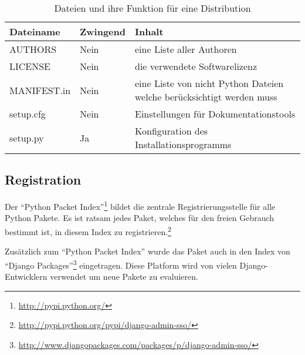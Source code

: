 \begin{table}[ht]
  \centering
  \begin{tabular}{|l|l|p{7cm}|}
  \hline
  Dateiname & Zwingend & Inhalt\\
  \hline
  AUTHORS & Nein & eine Liste aller Authoren\\
  \hline
  LICENSE & Nein & die verwendete Softwarelizenz\\
  \hline
  MANIFEST.in & Nein & eine Liste von nicht Python Dateien welche berücksichtigt werden muss\\
  \hline
  setup.cfg & Nein & Einstellungen für Dokumentationstools\\
  \hline
  setup.py & Ja & Konfiguration des Installationsprogramms\\
  \hline
  \end{tabular}
  \caption{Dateien und ihre Funktion für eine Distribution}
  \label{tab:paket_inhalt}
\end{table}

\subsection{Registration}
\label{sub:registration}
Der ``Python Packet Index''\footnote{\url{http://pypi.python.org/}} bildet die zentrale Registrierungsstelle für alle Python Pakete. Es ist ratsam jedes Paket, welches für den freien Gebrauch bestimmt ist, in diesem Index zu registrieren.\footnote{\url{http://pypi.python.org/pypi/django-admin-sso/}}

Zusätzlich zum ``Python Packet Index'' wurde das Paket auch in den Index von ``Django Packages''\footnote{\url{http://www.djangopackages.com/packages/p/django-admin-sso/}} eingetragen. Diese Platform wird von vielen Django-Entwicklern verwendet um neue Pakete zu evaluieren.
